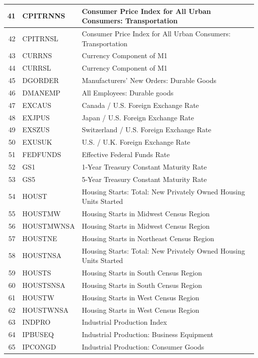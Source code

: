\documentclass[12pt]{article}
\begin{document}
\begin{table}[ht]
\label{fred data 3}
\centering
\begin{tabular}{r|p{4cm}p{11cm}}
    \hline
	41 & CPITRNNS & Consumer Price Index for All Urban Consumers: Transportation \\ 
	\hline
	42 & CPITRNSL & Consumer Price Index for All Urban Consumers: Transportation \\ 
	\hline
	43 & CURRNS & Currency Component of M1 \\ 
	\hline
	44 & CURRSL & Currency Component of M1 \\ 
	\hline
	45 & DGORDER & Manufacturers' New Orders: Durable Goods \\ 
	\hline
	46 & DMANEMP & All Employees: Durable goods \\ 
	\hline
	47 & EXCAUS & Canada / U.S. Foreign Exchange Rate \\ 
	\hline
	48 & EXJPUS & Japan / U.S. Foreign Exchange Rate \\ 
	\hline
	49 & EXSZUS & Switzerland / U.S. Foreign Exchange Rate \\ 
	\hline
	50 & EXUSUK & U.S. / U.K. Foreign Exchange Rate \\ 
	\hline
	51 & FEDFUNDS & Effective Federal Funds Rate \\ 
	\hline
	52 & GS1 & 1-Year Treasury Constant Maturity Rate \\ 
	\hline
	53 & GS5 & 5-Year Treasury Constant Maturity Rate \\ 
	\hline
	54 & HOUST & Housing Starts: Total: New Privately Owned Housing Units Started \\ 
	\hline
	55 & HOUSTMW & Housing Starts in Midwest Census Region \\ 
	\hline
	56 & HOUSTMWNSA & Housing Starts in Midwest Census Region \\ 
	\hline
	57 & HOUSTNE & Housing Starts in Northeast Census Region \\ 
	\hline
	58 & HOUSTNSA & Housing Starts: Total: New Privately Owned Housing Units Started \\ 
	\hline
	59 & HOUSTS & Housing Starts in South Census Region \\ 
	\hline
	60 & HOUSTSNSA & Housing Starts in South Census Region \\ 
	\hline
	61 & HOUSTW & Housing Starts in West Census Region \\ 
	\hline
	62 & HOUSTWNSA & Housing Starts in West Census Region \\ 
	\hline
	63 & INDPRO & Industrial Production Index \\ 
	\hline
	64 & IPBUSEQ & Industrial Production: Business Equipment \\ 
	\hline
	65 & IPCONGD & Industrial Production: Consumer Goods \\ 
	\hline
\end{tabular}
\end{table}
\end{document}
